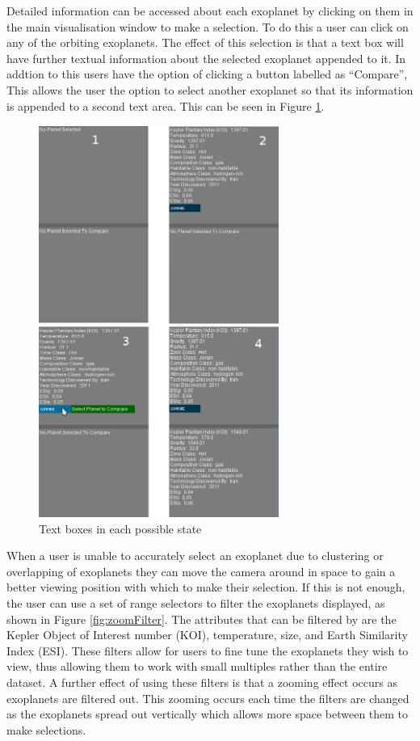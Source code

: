 Detailed information can be accessed about each exoplanet by clicking on them in
the main visualisation window to
make a selection. To do this a user can click on any of the orbiting exoplanets.
The effect of this selection is that a text box will have further textual
information about the selected exoplanet appended to it. In addtion to this
users have the option of clicking a button labelled  as ``Compare'', This allows
the user the option to select another exoplanet so that its information is
appended to a second text area. This can be seen in Figure \ref{fig:textBoxes}. 
\begin{figure}[H]
  \centering
      \includegraphics[width=0.7\textwidth]{images/textBoxes.jpg}
  \caption{Text boxes in each possible state}
  \label{fig:textBoxes}
\end{figure}
When a user is unable to accurately select an
exoplanet due to clustering or
overlapping of exoplanets they can move the camera around in space to gain a
better viewing position with which to make their selection. If this is not
enough, the user can use a set of range selectors to filter the exoplanets
displayed, as shown in Figure \ref{fig:zoomFilter}. The attributes that can be
filtered by are the Kepler Object of Interest number (KOI),
temperature, size, and Earth Similarity Index (ESI). These filters allow for
users to fine tune the exoplanets they wish to view, thus allowing them to work
with small multiples rather than the entire dataset. A further effect of using
these filters is that a zooming effect occurs as exoplanets are filtered out.
This zooming occurs each time the filters are changed as the exoplanets spread
out vertically which allows more space between them to make selections.

